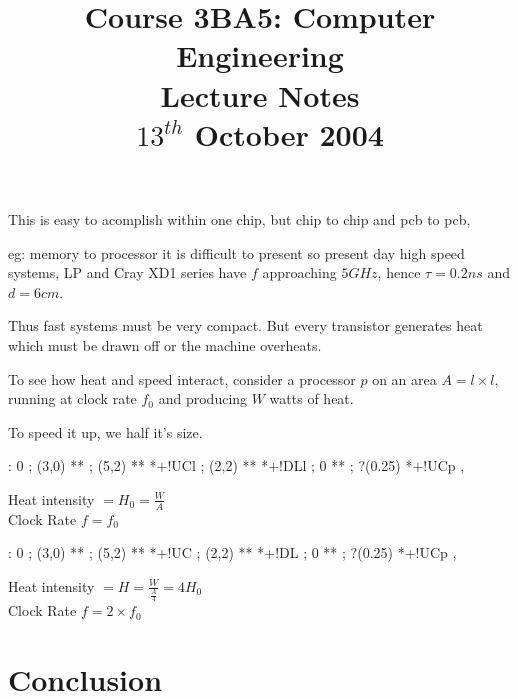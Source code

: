 \documentclass[a4paper,12pt]{article}
\begin{document}
\title{Course 3BA5: Computer Engineering \\ Lecture Notes \\ $13^{th}$ October 2004}

\maketitle

This is easy to acomplish within one chip, but chip to chip and pcb to
pcb,

eg: memory to processor it is difficult to present so present day high
speed systems, LP and Cray XD1 series have $f$ approaching $5GHz$, hence
$\tau = 0.2 ns$ and $d = 6cm$.

Thus fast systems must be very compact. But every transistor generates
heat which must be drawn off or the machine overheats.

To see how heat and speed interact, consider a processor $p$ on an area
$A = l \times l$, running at clock rate $f_{0}$ and producing $W$ watts
of heat.

To speed it up, we half it's size.

\begin{table}[hbtp]


\xy <1cm,0cm>:
0 ; (3,0) **\dir{-} ; 
(5,2) **\dir{-} *+!UC{l} ; 
(2,2) **\dir{-} *+!DL{l} ;
0 **\dir{-} ; ?(0.25) *+!UC{p} ,
\endxy

\end{table}

Heat intensity $= H_{0} = \frac{W}{A}$ \\
Clock Rate $f = f_{0}$

\begin{table}[hbtp]


\xy <1cm,0cm>:
0 ; (3,0) **\dir{-} ; 
(5,2) **\dir{-} *+!UC{} ; 
(2,2) **\dir{-} *+!DL{} ;
0 **\dir{-} ; ?(0.25) *+!UC{p} ,
\endxy

\end{table}

Heat intensity $= H = \frac{W}{\frac{A}{4}} = 4 H_{0}$ \\
Clock Rate $f = 2 \times f_{0}$

\section*{Conclusion}
\end{document}
